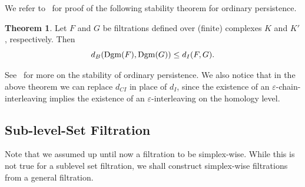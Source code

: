 \documentclass[10pt,a4paper]{amsart}
\newcommand {\mm}[1] {\ifmmode{#1}\else{\mbox{\(#1\)}}\fi}
\newcommand{\eps}        {\varepsilon}
\theoremstyle{definition}
\newcommand{\Dgm}{\mm{\mathrm{Dgm}}}
\newcommand{\red}{\color{red}}
\newtheorem{theorem}{Theorem}
\theoremstyle{remark}
\begin{document}

We refer to~\cite{ChazalCohenSteinerGlisse2009} for proof of the following 
stability theorem for ordinary persistence.

\begin{theorem}
\label{theorem:persistence-stability}
    Let $F$ and $G$ be filtrations defined over (finite) complexes $K$ and $K'$, respectively. Then 
    $$ d_B( \Dgm(F), \Dgm(G)) \leq d_I(F,G).$$
\end{theorem}

See~\cite{Cohen-SteinerEdelsbrunnerHarer2005, ChazalCohenSteinerGlisse2009} for more on the stability of ordinary persistence. We also notice that in the above theorem we can replace $d_{CI}$ in place of $d_I$, since the existence of an $\eps$-chain-interleaving implies the existence of an $\eps$-interleaving on the homology level. 


\subsection{Sub-level-Set Filtration}\label{sec:Sub-level-Set-Filtration}

Note that we assumed up until now a filtration to be simplex-wise. While this is not true for a sublevel set filtration, we shall construct simplex-wise filtrations from a general filtration. 
\end{document}
